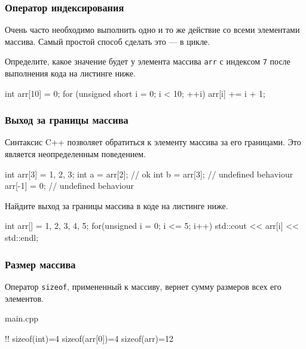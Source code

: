 \documentclass[compress, 8pt, aspectratio=169]{beamer}
\begin{document}
\begin{frame}[fragile]

    \frametitle{Оператор индексирования}

    Очень часто необходимо выполнить одно и то же действие
    со всеми элементами массива.
    Самый простой способ сделать это --- в цикле.

    \begin{task}
        Определите, какое значение будет у элемента массива \verb|arr|
        с индексом \verb|7| после выполнения кода на листинге ниже.
    \end{task}

    \begin{myinplacelisting}[minted language=cpp]
int arr[10] = {0};
for (unsigned short i = 0; i < 10; ++i) {
    arr[i] += i + 1;
}
    \end{myinplacelisting}

\end{frame}

\begin{frame}[fragile]

    \frametitle{Выход за границы массива}

    Синтаксис C++ позволяет обратиться к элементу массива за его
    границами.
    Это является неопределенным поведением\footnotemark{}.


    \begin{myinplacelisting}[minted language=cpp]
int arr[3] = {1, 2, 3};
int a = arr[2]; // ok
int b = arr[3]; // undefined behaviour
arr[-1] = 0; // undefined behaviour
    \end{myinplacelisting}

    \begin{task}
        Найдите выход за границы массива в коде на листинге ниже.
    \end{task}

    \begin{myinplacelisting}[minted language=cpp]
int arr[] = {1, 2, 3, 4, 5};
for(unsigned i = 0; i <= 5; i++) {
    std::cout << arr[i] << std::endl;
}
    \end{myinplacelisting}

\end{frame}

\begin{frame}[fragile]

    \frametitle{Размер массива}

    \hfill \break
    \hfill \break
    Оператор \verb|sizeof|, примененный к массиву, вернет сумму размеров
    всех его элементов.

        {main.cpp}

    \begin{terminalwindow}
!!
sizeof(int)=4
sizeof(arr[0])=4
sizeof(arr)=12
    \end{terminalwindow}

\end{frame}
\end{document}
